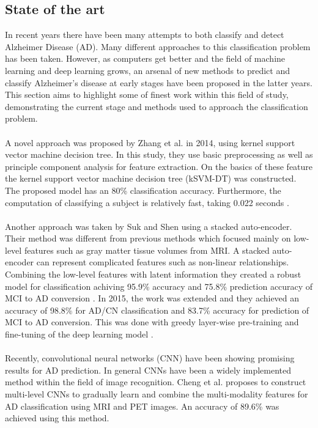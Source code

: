 \documentclass[12pt, fleqn, titlepage]{article}
\begin{document}
\subsection{State of the art}
In recent years there have been many attempts to both classify and detect Alzheimer Disease (AD). Many different approaches to this classification problem has been taken. However, as computers get better and the field of machine learning and deep learning grows, an arsenal of new methods to predict and classify Alzheimer's disease at early stages have been proposed in the latter years. This section aims to highlight some of finest work within this field of study, demonstrating the current stage and methods used to approach the classification problem. 
\\\\
\noindent
A novel approach was proposed by Zhang et al. in 2014, using kernel support vector machine decision tree. In this study, they use basic preprocessing as well as principle component analysis for feature extraction. On the basics of these feature the kernel support vector machine decision tree (kSVM-DT) was constructed. The proposed model has an 80\% classification accuracy. Furthermore, the computation of classifying a subject is relatively fast, taking 0.022 seconds \cite{yudong}. 
\\\\
Another approach was taken by Suk and Shen using a stacked auto-encoder. Their method was different from previous methods which focused mainly on low-level features such as gray matter tissue volumes from MRI. A stacked auto-encoder can represent complicated features such as non-linear relationships. Combining the low-level features with latent information they created a robust model for classification achiving 95.9\% accuracy and  75.8\% prediction accuracy of MCI to AD conversion \cite{suk_and_shen_1}. In 2015, the work was extended and they achieved an accuracy of  98.8\% for AD/CN classification and 83.7\% accuracy for prediction of MCI to AD conversion. This was done with greedy layer-wise pre-training and fine-tuning of the deep learning model \cite{suk_and_shen_2}.
\\\\
Recently, convolutional neural networks (CNN) have been showing promising results for AD prediction. In general CNNs have been a widely implemented method within the field of image recognition. Cheng et al. proposes to construct multi-level CNNs to gradually learn and combine the multi-modality features for AD classification using MRI and PET images. An accuracy of 89.6\% was achieved using this method. \cite{cheng}
\end{document}
